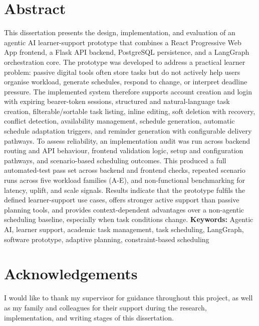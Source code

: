 \documentclass[12pt]{article}
\begin{document}


\section*{Abstract}
This dissertation presents the design, implementation, and evaluation of an agentic AI learner-support prototype that combines a React Progressive Web App frontend, a Flask API backend, PostgreSQL persistence, and a LangGraph orchestration core. The prototype was developed to address a practical learner problem: passive digital tools often store tasks but do not actively help users organise workload, generate schedules, respond to change, or interpret deadline pressure. The implemented system therefore supports account creation and login with expiring bearer-token sessions, structured and natural-language task creation, filterable/sortable task listing, inline editing, soft deletion with recovery, conflict detection, availability management, schedule generation, automatic schedule adaptation triggers, and reminder generation with configurable delivery pathways. To assess reliability, an implementation audit was run across backend routing and API behaviour, frontend validation logic, setup and configuration pathways, and scenario-based scheduling outcomes. This produced a full automated-test pass set across backend and frontend checks, repeated scenario runs across five workload families (A-E), and non-functional benchmarking for latency, uplift, and scale signals. Results indicate that the prototype fulfils the defined learner-support use cases, offers stronger active support than passive planning tools, and provides context-dependent advantages over a non-agentic scheduling baseline, especially when task conditions change.
\newline
\textbf{Keywords:} 
Agentic AI, learner support, academic task management, task scheduling, LangGraph, software prototype, adaptive planning, constraint-based scheduling

\newpage
\section*{Acknowledgements}
I would like to thank my supervisor for guidance throughout this project, as well as my family and colleagues for their support during the research, implementation, and writing stages of this dissertation.

\newpage
\tableofcontents
\end{document}
